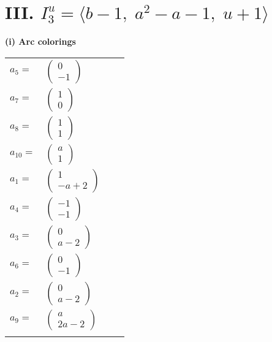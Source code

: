 \documentclass[1p]{elsarticle_modified}
\theoremstyle{definition}
\begin{document}
\centering \section*{III. $I^u_{3}= \langle b-1,\;a^2- a-1,\;u+1 \rangle$}
\flushleft \textbf{(i) Arc colorings}\\
\begin{tabular}{m{7pt} m{180pt} m{7pt} m{180pt} }
\flushright $a_{5}=$&$\begin{pmatrix}0\\-1\end{pmatrix}$ \\
\flushright $a_{7}=$&$\begin{pmatrix}1\\0\end{pmatrix}$ \\
\flushright $a_{8}=$&$\begin{pmatrix}1\\1\end{pmatrix}$ \\
\flushright $a_{10}=$&$\begin{pmatrix}a\\1\end{pmatrix}$ \\
\flushright $a_{1}=$&$\begin{pmatrix}1\\- a+2\end{pmatrix}$ \\
\flushright $a_{4}=$&$\begin{pmatrix}-1\\-1\end{pmatrix}$ \\
\flushright $a_{3}=$&$\begin{pmatrix}0\\a-2\end{pmatrix}$ \\
\flushright $a_{6}=$&$\begin{pmatrix}0\\-1\end{pmatrix}$ \\
\flushright $a_{2}=$&$\begin{pmatrix}0\\a-2\end{pmatrix}$ \\
\flushright $a_{9}=$&$\begin{pmatrix}a\\2 a-2\end{pmatrix}$\\&\end{tabular}
\end{document}
